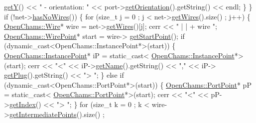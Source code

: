 \begin{DoxyCodeInclude}
      \hyperlink{class_open_chams_1_1_port_acd84440598b1da2a23c326ce371db4e4}{getY}() << \textcolor{stringliteral}{" - orientation: "} << port->\hyperlink{class_open_chams_1_1_port_acbe891eaa3be07cacb7385362ab98ecc}{getOrientation}().getString() << endl;
                    \}
                \}
                \textcolor{keywordflow}{if} (!net->\hyperlink{class_open_chams_1_1_net_ac9470e72b26d4cddef3d13e69057ee54}{hasNoWires}()) \{
                    \textcolor{keywordflow}{for} (\textcolor{keywordtype}{size\_t} j = 0 ; j < net->\hyperlink{class_open_chams_1_1_net_a2f8bcf7cad7711850efeca408f146b8a}{getWires}().size() ; j++) \{
                        \hyperlink{class_open_chams_1_1_wire}{OpenChams::Wire}* wire = net->\hyperlink{class_open_chams_1_1_net_a2f8bcf7cad7711850efeca408f146b8a}{getWires}()[j];
                        cerr << \textcolor{stringliteral}{" | | + wire  "};
                        \hyperlink{class_open_chams_1_1_wire_point}{OpenChams::WirePoint}* start = wire->
      \hyperlink{class_open_chams_1_1_wire_ad68ddfcb6d4cbbe3c06d03fb4350dcdb}{getStartPoint}();
                        \textcolor{keywordflow}{if} (dynamic\_cast<OpenChams::InstancePoint*>(start)) \{
                            \hyperlink{class_open_chams_1_1_instance_point}{OpenChams::InstancePoint}* iP = \textcolor{keyword}{static\_cast<}
      \hyperlink{class_open_chams_1_1_instance_point}{OpenChams::InstancePoint}*\textcolor{keyword}{>}(start);
                            cerr << \textcolor{stringliteral}{"<"} << iP->\hyperlink{class_open_chams_1_1_instance_point_a2858c0c4e8b5108f041237cf5a802029}{getName}().getString() << \textcolor{stringliteral}{","} << iP->
      \hyperlink{class_open_chams_1_1_instance_point_a646d464666fc56ab2e04a6b87fdd3279}{getPlug}().getString() << \textcolor{stringliteral}{"> "};
                        \} \textcolor{keywordflow}{else} \textcolor{keywordflow}{if} (dynamic\_cast<OpenChams::PortPoint*>(start)) \{
                            \hyperlink{class_open_chams_1_1_port_point}{OpenChams::PortPoint}* pP = \textcolor{keyword}{static\_cast<}
      \hyperlink{class_open_chams_1_1_port_point}{OpenChams::PortPoint}*\textcolor{keyword}{>}(start);
                            cerr << \textcolor{stringliteral}{"<"} << pP->\hyperlink{class_open_chams_1_1_port_point_ab4018980dcd1fed5208e7a72846cd815}{getIndex}() << \textcolor{stringliteral}{"> "};
                        \}
                        \textcolor{keywordflow}{for} (\textcolor{keywordtype}{size\_t} k = 0 ; k < wire->\hyperlink{class_open_chams_1_1_wire_aac2840e22e03db0ff2c0fe0f83c56fdd}{getIntermediatePoints}().size() ;

\end{DoxyCodeInclude}
